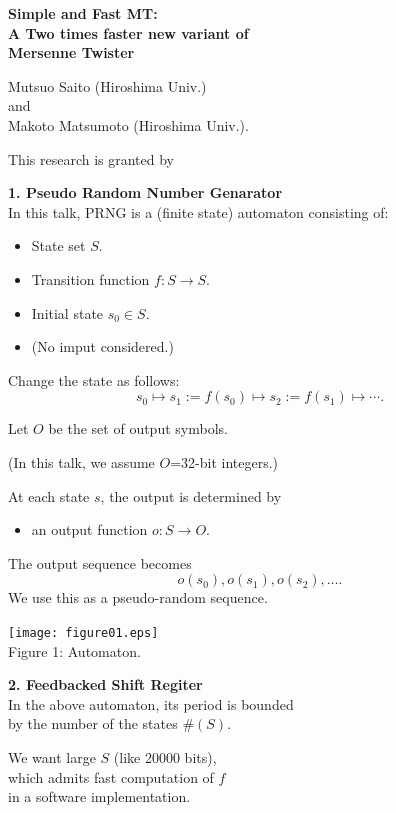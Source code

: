 \documentclass[a4j,12pt,landscape]{jarticle}
\title{}
\author{}
\date{\today}
\begin{document}
\Huge

\vspace*{2cm}
\begin{center}
{\bf Simple and Fast MT:\\
  A Two times faster new variant of \\
  Mersenne Twister}
\vspace{1cm}

Mutsuo Saito (Hiroshima Univ.) \\
and \\
Makoto Matsumoto (Hiroshima Univ.).
\end{center}
\vspace{\fill}
This research is granted by 
\newpage

\newpage
\noindent
{\bf 1. Pseudo Random Number Genarator}\\

In this talk, PRNG is a (finite state) automaton consisting of:
\begin{itemize}
\item State set $S$. 
\item Transition function $f:S \to S$.
\item Initial state $s_0 \in S$.
\item (No imput considered.)
\end{itemize}
Change the state as follows:
$$
s_0 \mapsto s_1:= f(s_0) \mapsto s_2:=f(s_1) \mapsto \cdots.
$$

\newpage
Let $O$ be the set of output symbols.

(In this talk, we assume $O$=32-bit integers.)

\vskip 1cm
At each state $s$, 
the output is determined by 
\begin{itemize}
\item an output function $o:S \to O$.
\end{itemize}
The output sequence becomes
$$
o(s_0),o(s_1),o(s_2),\ldots.
$$
We use this as a pseudo-random sequence.
\newpage
\begin{center}
\texttt{[image: figure01.eps]}
\\
Figure 1: Automaton.
\end{center}

 
\newpage
\noindent
{\bf 2. Feedbacked Shift Regiter}\\
In the above automaton, 
its period is bounded  \\
by the number of the states $\#(S)$.

\vskip 5mm
We want large $S$ (like 20000 bits), \\
which admits fast computation of $f$ \\
in a software implementation.
\end{document}
